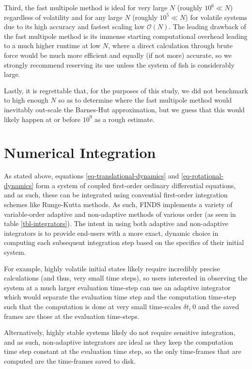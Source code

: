 \documentclass[letterpaper, 10pt, twoside]{LTJournalArticle}
\renewcommand{\O}{\mathcal{O}}
\begin{document}
Third, the fast multipole method is ideal for very large $N$ (roughly
$10^6 \ll N$) regardless of volatility and for any large $N$ (roughly
$10^5 \ll N$) for volatile systems due to its high accuracy and fastest scaling
law $\O(N)$. The leading drawback of the fast multipole method is its
immense starting computational overhead leading to a much higher runtime at low
$N$, where a direct calculation through brute force would be much more efficient
and equally (if not more) accurate, so we strongly recommend reserving its use
unless the system of fish is considerably large.

Lastly, it is regrettable that, for the purposes of this study, we did not benchmark to
high enough $N$ so as to determine where the fast multipole method would
inevitably out-scale the Barnes-Hut approximation, but we guess that this would
likely happen at or before $10^9$ as a rough estimate.

\section{Numerical Integration}
\label{section-integration}

As stated above, equations \ref{eq-translational-dynamics} and
\ref{eq-rotational-dynamics} form a system of coupled first-order ordinary
differential equations, and as such, these can be integrated using convential
first-order integration schemes like Runge-Kutta methods. As such, FINDS
implements a variety of variable-order adaptive and non-adaptive methods of
various order (as seen in table \ref{tbl-integrators}). The intent in using both
adaptive and non-adaptive integrators is to provide end-users with a more exact,
dynamic choice in computing each subsequent integration step based on the
specifics of their initial system.

For example, highly volatile initial states likely require incredibly precise
calculations (and thus, very small time steps), so users interested in
observing the system at a much larger evaluation time-step can use an adaptive
integrator which would separate the evaluation time step and the computation
time-step such that the computation is done at very small time-scales
$\delta t_i ~ 0$ and the saved frames are those at the evaluation time-steps.

Alternatively, highly stable systems likely do not require sensitive integration,
and as such, non-adaptive integrators are ideal as they keep the computation
time step constant at the evaluation time step, so the only time-frames that are
computed are the time-frames saved to disk.
\end{document}

